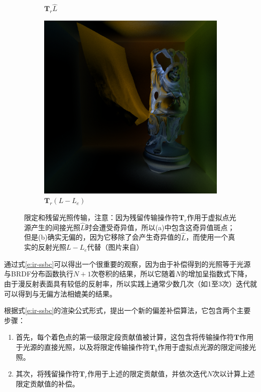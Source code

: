 \begin{figure}
\begin{fullwidth}
\begin{subfigure}[b]{0.195\thewidth}
		\caption{$\mathbf{T}_r\hat{L}$}
	\end{subfigure}
	\begin{subfigure}[b]{0.195\thewidth}
		\includegraphics[width=1.0\textwidth]{figures/ir/ir-7-6}
		\caption{$\mathbf{T}_r(L-L_e)$}
	\end{subfigure}
\caption{限定和残留光照传输，注意：因为残留传输操作符$\mathbf{T}_r$作用于虚拟点光源产生的间接光照$\hat{L}$时会遭受奇异值，所以(a)中包含这奇异值斑点；但是(b)确实无偏的，因为它移除了会产生奇异值的$\hat{L}$，而使用一个真实的反射光照$L-L_e$代替（图片来自\cite{a:Screen-SpaceBiasCompensationfor}）}
\label{f:ir-residual-operator}
\end{fullwidth}
\end{figure}

通过式\ref{e:ir-ssbc}可以得出一个很重要的观察，因为由于补偿得到的光照等于光源与BRDF分布函数执行$N+1$次卷积的结果，所以它随着$N$的增加呈指数式下降，由于漫反射表面具有较低的反射率，所以实践上通常少数几次（如1至3次）迭代就可以得到与无偏方法相媲美的结果。

根据式\ref{e:ir-ssbc}的渲染公式形式，\cite{a:Screen-SpaceBiasCompensationfor}提出一个新的偏差补偿算法，它包含两个主要步骤：

\begin{enumerate}
	\item 首先，每个着色点的第一级限定段贡献值被计算，这包含将传输操作符$\mathbf{T}$作用于光源的直接光照，以及将限定传输操作符$\mathbf{T}_b$作用于虚拟点光源的限定间接光照。
	\item 其次，将残留操作符$\mathbf{T}_r$作用于上述的限定贡献值，并依次迭代$N$次以计算上述限定贡献值的补偿。
\end{enumerate}

